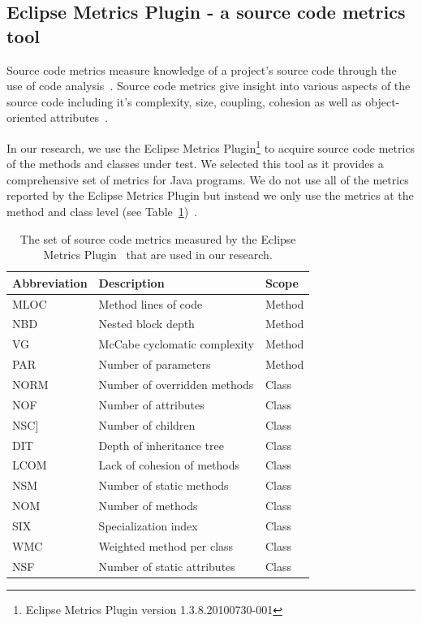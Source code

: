 \documentclass[conference]{IEEEtran}
\begin{document}
\subsection{Eclipse Metrics Plugin - a source code metrics tool}
\label{subsec:Metrics}
Source code metrics measure knowledge of a project's source code through the use of code analysis~\cite{SCE05,McCa76,Kan02}. Source code metrics give insight into various aspects of the source code including it's complexity, size, coupling, cohesion as well as object-oriented attributes~\cite{Hend95}.

In our research, we use the Eclipse Metrics Plugin\footnote{Eclipse Metrics Plugin version 1.3.8.20100730-001} to acquire source code metrics of the methods and classes under test. We selected this tool as it provides a comprehensive set of metrics for Java programs. We do not use all of the metrics reported by the Eclipse Metrics Plugin but instead we only use the metrics at the method and class level (see Table~\ref{tab:source_code_metrics})~\cite{Metrics}.

\begin{table}[!t]
  \centering
  \begin{tabular}{|l|l|l|}
    \hline
    \rowcolor[RGB]{169,196,223}
    \textbf{Abbreviation} & \textbf{Description} & \textbf{Scope} \\
    \hline MLOC & Method lines of code &  Method \\
    \hline NBD & Nested block depth &  Method \\
    \hline VG & McCabe cyclomatic complexity &  Method \\
    \hline PAR & Number of parameters &  Method \\
    \hline NORM & Number of overridden methods &  Class \\
    \hline NOF & Number of attributes &  Class \\
    \hline NSC]& Number of children &  Class \\
    \hline DIT & Depth of inheritance tree &  Class \\
    \hline LCOM & Lack of cohesion of methods &  Class \\
    \hline NSM & Number of static methods &  Class \\
    \hline NOM & Number of methods &  Class \\
    \hline SIX & Specialization index &  Class \\
    \hline WMC & Weighted method per class &  Class \\
    \hline NSF & Number of static attributes &  Class \\
    \hline
  \end{tabular}
  \caption{The set of source code metrics measured by the Eclipse Metrics Plugin~\cite{Metrics} that are used in our research.}
  \label{tab:source_code_metrics}
\end{table}
\end{document}
